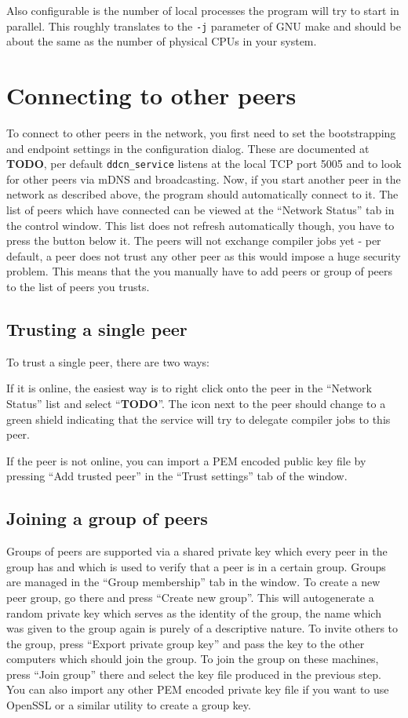 \documentclass[a4paper,9pt]{scrartcl}
\begin{document}
Also configurable is the number of local processes the program will try to start in parallel. This roughly translates to the \texttt{-j} parameter of GNU make and should be about the same as the number of physical CPUs in your system.

\section{Connecting to other peers}

To connect to other peers in the network, you first need to set the bootstrapping and endpoint settings in the configuration dialog. These are documented at \textbf{TODO}, per default \texttt{ddcn\_service} listens at the local TCP port 5005 and to look for other peers via mDNS and broadcasting. Now, if you start another peer in the network as described above, the program should automatically connect to it. The list of peers which have connected can be viewed at the ``Network Status'' tab in the control window. This list does not refresh automatically though, you have to press the button below it.
The peers will not exchange compiler jobs yet - per default, a peer does not trust any other peer as this would impose a huge security problem. This means that the you manually have to add peers or group of peers to the list of peers you trusts.

\subsection{Trusting a single peer}

To trust a single peer, there are two ways:

If it is online, the easiest way is to right click onto the peer in the ``Network Status'' list and select ``\textbf{TODO}''. The icon next to the peer should change to a green shield indicating that the service will try to delegate compiler jobs to this peer.

If the peer is not online, you can import a PEM encoded public key file by pressing ``Add trusted peer'' in the ``Trust settings'' tab of the window.

\subsection{Joining a group of peers}

Groups of peers are supported via a shared private key which every peer in the group has and which is used to verify that a peer is in a certain group. Groups are managed in the ``Group membership'' tab in the window. To create a new peer group, go there and press ``Create new group''. This will autogenerate a random private key which serves as the identity of the group, the name which was given to the group again is purely of a descriptive nature. To invite others to the group, press ``Export private group key'' and pass the key to the other computers which should join the group. To join the group on these machines, press ``Join group'' there and select the key file produced in the previous step. You can also import any other PEM encoded private key file if you want to use OpenSSL or a similar utility to create a group key.
\end{document}
